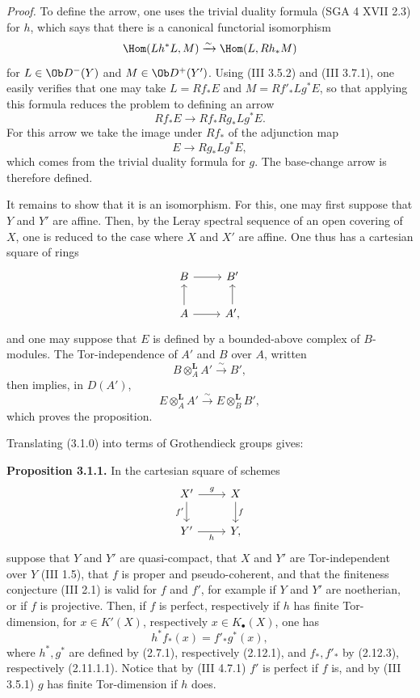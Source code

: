 \emph{Proof.} To define the arrow, one uses the trivial duality formula (SGA 4 XVII 2.3) for \(h\), which says that there is a canonical functorial isomorphism
\[
 \Hom(Lh^*L,M)\xrightarrow{\sim}\Hom(L,Rh_*M)
\]
for \(L\in\Ob D^-(Y)\) and \(M\in\Ob D^+(Y')\). Using (III 3.5.2) and (III 3.7.1), one easily verifies that one may take \(L=Rf_*E\) and \(M=Rf'_*Lg^*E\), so that applying this formula reduces the problem to defining an arrow
\[
 Rf_*E\longrightarrow Rf_*Rg_*Lg^*E.
\]
For this arrow we take the image under \(Rf_*\) of the adjunction map
\[
 E\longrightarrow Rg_*Lg^*E,
\]
which comes from the trivial duality formula for \(g\). The base-change arrow is therefore defined.

It remains to show that it is an isomorphism. For this, one may first suppose that \(Y\) and \(Y'\) are affine. Then, by the Leray spectral sequence of an open covering of \(X\), one is reduced to the case where \(X\) and \(X'\) are affine. One thus has a cartesian square of rings
\[
\begin{tikzcd}
B\arrow[r] & B'\\
A\arrow[u]\arrow[r] & A'\arrow[u],
\end{tikzcd}
\]
and one may suppose that \(E\) is defined by a bounded-above complex of \(B\)-modules. The Tor-independence of \(A'\) and \(B\) over \(A\), written
\[
 B\otimes_A^{\mathbf L}A'\xrightarrow{\sim}B',
\]
then implies, in \(D(A')\),
\[
 E\otimes_A^{\mathbf L}A'\xrightarrow{\sim}E\otimes_B^{\mathbf L}B',
\]
which proves the proposition.

Translating (3.1.0) into terms of Grothendieck groups gives:

\textbf{Proposition 3.1.1.} In the cartesian square of schemes
\[
\begin{tikzcd}
X' \arrow[r,"g"]\arrow[d,"f'"'] & X\arrow[d,"f"]\\
Y' \arrow[r,"h"'] & Y,
\end{tikzcd}
\]
suppose that \(Y\) and \(Y'\) are quasi-compact, that \(X\) and \(Y'\) are Tor-independent over \(Y\) (III 1.5), that \(f\) is proper and pseudo-coherent, and that the finiteness conjecture (III 2.1) is valid for \(f\) and \(f'\), for example if \(Y\) and \(Y'\) are noetherian, or if \(f\) is projective. Then, if \(f\) is perfect, respectively if \(h\) has finite Tor-dimension, for \(x\in K'(X)\), respectively \(x\in K_{\bullet}(X)\), one has
\[
 h^* f_*(x)=f'_* g^*(x),
\]
where \(h^*,g^*\) are defined by (2.7.1), respectively (2.12.1), and \(f_*,f'_*\) by (2.12.3), respectively (2.11.1.1). Notice that by (III 4.7.1) \(f'\) is perfect if \(f\) is, and by (III 3.5.1) \(g\) has finite Tor-dimension if \(h\) does.


